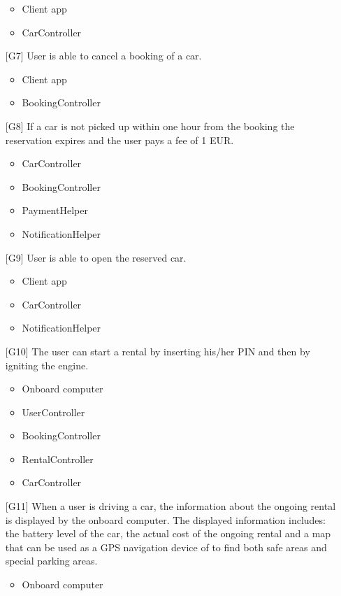 \begin{itemize}
		\begin{itemize}
			\item Client app
			\item CarController
		\end{itemize}
	\item[{[G7]}] User is able to cancel a booking of a car.
		\begin{itemize}
			\item Client app
			\item BookingController
		\end{itemize}
	\item[{[G8]}] If a car is not picked up within one hour from the booking the reservation expires and the user pays a fee of 1 EUR.
		\begin{itemize}
			\item CarController
			\item BookingController
			\item PaymentHelper
			\item NotificationHelper
		\end{itemize}
	\item[{[G9]}] User is able to open the reserved car.
		\begin{itemize}
			\item Client app
			\item CarController
			\item NotificationHelper
		\end{itemize}
	\item[{[G10]}] The user can start a rental by inserting his/her PIN and then by igniting the engine.
		\begin{itemize}
			\item Onboard computer
			\item UserController
			\item BookingController
			\item RentalController
			\item CarController
		\end{itemize}
	\item[{[G11]}] When a user is driving a car, the information about the ongoing rental is displayed by the onboard computer. The displayed information includes: the battery level of the car, the actual cost of the ongoing rental and a map that can be used as a GPS navigation device of to find both safe areas and special parking areas.
		\begin{itemize}
			\item Onboard computer

\end{itemize}
\end{itemize}
